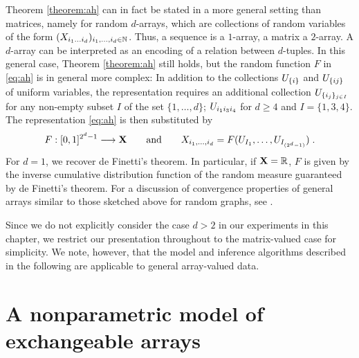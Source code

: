Theorem \ref{theorem:ah} can in fact be stated in a more general setting than matrices, namely for random $d$-arrays, which are collections
of random variables of the form $(X_{i_1\dots i_d})_{i_1,\dots,i_d\in\mathbb{N}}$. Thus, a sequence is a $1$-array, a matrix a $2$-array. A $d$-array 
can be interpreted as an encoding of a relation between $d$-tuples.
In this general case, Theorem \ref{theorem:ah} still holds, but the random function $F$ in \eqref{eq:ah} is in general more complex:
In addition to the collections $U_{\lbrace i\rbrace}$ and $U_{\lbrace ij\rbrace}$ of uniform variables, the representation requires an additional
collection $U_{\lbrace i_j\rbrace_{j\in I}}$ for any non-empty subset $I$ of the set $\lbrace 1,\ldots,d\rbrace$; \eg
$U_{i_1 i_3 i_4}$ for $d\geq 4$ and ${I=\lbrace 1,3,4\rbrace}$. The representation \eqref{eq:ah} is then substituted by
\begin{equation}
  F:[0,1]^{2^d-1}\longrightarrow\mathbf{X}\qquad\text{and}\qquad X_{i_1,\dots,i_d}=F(U_{I_1},\dots,U_{I_{(2^d-1)}})\;.
\end{equation}
For $d=1$, we recover de Finetti's theorem. In particular, if $\mathbf{X}=\mathbb{R}$, $F$ is given by the inverse cumulative distribution function
of the random measure guaranteed by de Finetti's theorem.
For a discussion of convergence properties of general arrays similar to those sketched above for random graphs, see 
\citep{Aldous:2009}.

Since we do not explicitly consider the case $d>2$ in our experiments in this chapter, we restrict 
our presentation throughout to the matrix-valued case for simplicity. We note, however, that the model and inference algorithms described in the
following are applicable to general array-valued data.

\section{A nonparametric model of exchangeable arrays}

